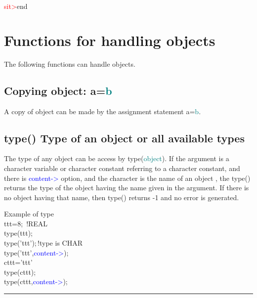 {\begin{itemize}
\begin{itemize}
\textcolor{Red}{sit>}end 
\section{Functions for handling objects} 
\label{objects} 
The following functions can handle objects. 
\subsection{	Copying object: a=\textcolor{teal}{b}} 
\label{copy} 
A copy of object can be made by the assignment statement a=\textcolor{teal}{b}. 
\subsection{\textcolor{VioletRed}{type}() Type of an object or all available types} 
\label{type} 
The type of any object can be access by \textcolor{VioletRed}{type}(\textcolor{teal}{object}). 
If the argument is a character variable or character constant referring to 
a character constant, and there is \textcolor{blue}{content->} option, and the character is the name of 
an object , the \textcolor{VioletRed}{type}() returns the type of the object having the name given in the argument. 
If there is no object having that name, then \textcolor{VioletRed}{type}() returns -1 and no error is generated. 
\singlespacing 
\begin{example}[typeex]Example of type\\ 
\label{typeex} 
\noindent ttt=8;\,\,\,{\color{ForestGreen}!REAL}\\ 
\textcolor{VioletRed}{type}(ttt);\\ 
\textcolor{VioletRed}{type}('ttt');\,{\color{ForestGreen}!type is CHAR}\\ 
\textcolor{VioletRed}{type}('ttt',\textcolor{blue}{content->});\\ 
cttt='ttt'\\ 
\textcolor{VioletRed}{type}(cttt);\\ 
\textcolor{VioletRed}{type}(cttt,\textcolor{blue}{content->});\\ 
\end{example} 
\vspace{-7mm} \rule{5cm}{0.1pt} 
\onehalfspacing 

\end{itemize}
\end{itemize}}
